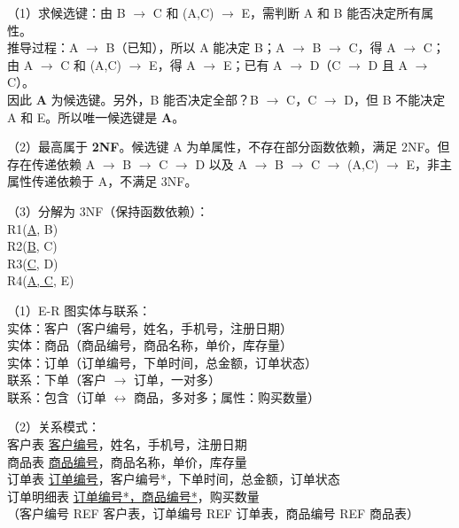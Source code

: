 \documentclass[a4paper,11pt]{article}
\begin{document}
\q （1）求候选键：由 B $\rightarrow$ C 和 (A,C) $\rightarrow$ E，需判断 A 和 B 能否决定所有属性。\\
推导过程：A $\rightarrow$ B（已知），所以 A 能决定 B；A $\rightarrow$ B $\rightarrow$ C，得 A $\rightarrow$ C；由 A $\rightarrow$ C 和 (A,C) $\rightarrow$ E，得 A $\rightarrow$ E；已有 A $\rightarrow$ D（C $\rightarrow$ D 且 A $\rightarrow$ C）。\\
因此 \textbf{A} 为候选键。另外，B 能否决定全部？B $\rightarrow$ C，C $\rightarrow$ D，但 B 不能决定 A 和 E。所以唯一候选键是 \textbf{A}。

\par（2）最高属于 \textbf{2NF}。候选键 A 为单属性，不存在部分函数依赖，满足 2NF。但存在传递依赖 A $\rightarrow$ B $\rightarrow$ C $\rightarrow$ D 以及 A $\rightarrow$ B $\rightarrow$ C $\rightarrow$ (A,C) $\rightarrow$ E，非主属性传递依赖于 A，不满足 3NF。

\par（3）分解为 3NF（保持函数依赖）：\\
R1(\underline{A}, B)\\
R2(\underline{B}, C)\\
R3(\underline{C}, D)\\
R4(\underline{A, C}, E)


\q （1）E-R 图实体与联系：\\
实体：客户（客户编号，姓名，手机号，注册日期）\\
实体：商品（商品编号，商品名称，单价，库存量）\\
实体：订单（订单编号，下单时间，总金额，订单状态）\\
联系：下单（客户 $\to$ 订单，一对多）\\
联系：包含（订单 $\leftrightarrow$ 商品，多对多；属性：购买数量）

\par（2）关系模式：\\
客户表 \underline{客户编号}，姓名，手机号，注册日期\\
商品表 \underline{商品编号}，商品名称，单价，库存量\\
订单表 \underline{订单编号}，客户编号*，下单时间，总金额，订单状态\\
订单明细表 \underline{订单编号*，商品编号*}，购买数量\\
（客户编号 REF 客户表，订单编号 REF 订单表，商品编号 REF 商品表）

\end{document}
